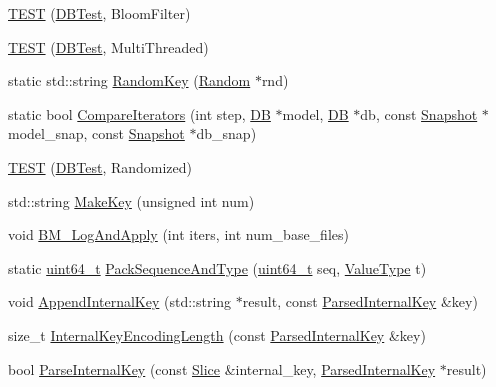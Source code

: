 \begin{DoxyCompactItemize}
\item 
\hyperlink{namespaceleveldb_a6d54978f51e046c170696cbb320f23f1}{T\+E\+S\+T} (\hyperlink{classleveldb_1_1_d_b_test}{D\+B\+Test}, Bloom\+Filter)
\item 
\hyperlink{namespaceleveldb_a9bee47c386abe6004d884f2552bd8184}{T\+E\+S\+T} (\hyperlink{classleveldb_1_1_d_b_test}{D\+B\+Test}, Multi\+Threaded)
\item 
static std\+::string \hyperlink{namespaceleveldb_a1c336258072dc26d61cabcda6bc2db75}{Random\+Key} (\hyperlink{classleveldb_1_1_random}{Random} $\ast$rnd)
\item 
static bool \hyperlink{namespaceleveldb_a5d2ddf843172352a05569e55d7b84a13}{Compare\+Iterators} (int step, \hyperlink{classleveldb_1_1_d_b}{D\+B} $\ast$model, \hyperlink{classleveldb_1_1_d_b}{D\+B} $\ast$db, const \hyperlink{classleveldb_1_1_snapshot}{Snapshot} $\ast$model\+\_\+snap, const \hyperlink{classleveldb_1_1_snapshot}{Snapshot} $\ast$db\+\_\+snap)
\item 
\hyperlink{namespaceleveldb_a028ed215c12e1998d7073b18fce4c24c}{T\+E\+S\+T} (\hyperlink{classleveldb_1_1_d_b_test}{D\+B\+Test}, Randomized)
\item 
std\+::string \hyperlink{namespaceleveldb_a706c78e756ff2dcd2185cdf2265c0b8a}{Make\+Key} (unsigned int num)
\item 
void \hyperlink{namespaceleveldb_af9cf6ec167c9b6f25fd050ab6fb67a90}{B\+M\+\_\+\+Log\+And\+Apply} (int iters, int num\+\_\+base\+\_\+files)
\item 
static \hyperlink{stdint_8h_aaa5d1cd013383c889537491c3cfd9aad}{uint64\+\_\+t} \hyperlink{namespaceleveldb_aefa1c5ac4d405fe1077c19fa2fe68647}{Pack\+Sequence\+And\+Type} (\hyperlink{stdint_8h_aaa5d1cd013383c889537491c3cfd9aad}{uint64\+\_\+t} seq, \hyperlink{namespaceleveldb_acc038cb0d608414730cafa459a4ba866}{Value\+Type} t)
\item 
void \hyperlink{namespaceleveldb_a7192bb79e7fa6ba01490473941386534}{Append\+Internal\+Key} (std\+::string $\ast$result, const \hyperlink{structleveldb_1_1_parsed_internal_key}{Parsed\+Internal\+Key} \&key)
\item 
size\+\_\+t \hyperlink{namespaceleveldb_a8406e76939e7e97465acf293f1585581}{Internal\+Key\+Encoding\+Length} (const \hyperlink{structleveldb_1_1_parsed_internal_key}{Parsed\+Internal\+Key} \&key)
\item 
bool \hyperlink{namespaceleveldb_a5a173b622e86c7a2f9beae3ac8818ac3}{Parse\+Internal\+Key} (const \hyperlink{classleveldb_1_1_slice}{Slice} \&internal\+\_\+key, \hyperlink{structleveldb_1_1_parsed_internal_key}{Parsed\+Internal\+Key} $\ast$result)

\end{DoxyCompactItemize}
